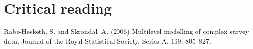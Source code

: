 \section{Critical reading}
Rabe-Hesketh, S. and Skrondal, A. (2006) Multilevel modelling of complex survey data. Journal of the Royal Statistical Society, Series A, 169, 805--827.
\endinput